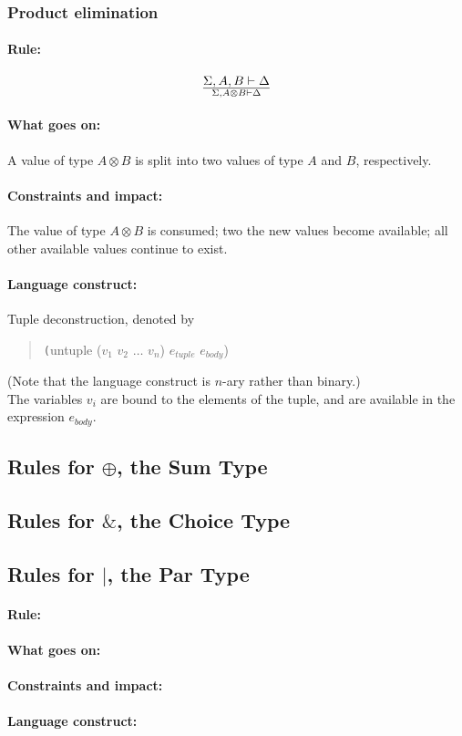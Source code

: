 \documentclass[a4paper]{article}
\begin{document}
\subsubsection{Product elimination}
\paragraph{Rule:}
$$
{
  \Sigma, A, B \vdash \Delta
}\over{
  \Sigma, A\otimes B \vdash \Delta
}
$$

\paragraph{What goes on:} A value of type $A \otimes B$ is split into two values of type $A$ and $B$, respectively.
\paragraph{Constraints and impact:} The value of type $A \otimes B$ is consumed; two the new values become available; all other available values continue to exist.
\paragraph{Language construct:} Tuple deconstruction, denoted by
\begin{quote}\texttt
  (untuple ($v_1$ $v_2$ $\ldots$ $v_n$) $e_{tuple}$ $e_{body}$)
\end{quote}
(Note that the language construct is $n$-ary rather than binary.)\\
The variables $v_i$ are bound to the elements of the tuple, and are available in the expression $e_{body}$.


\subsection{Rules for $\oplus$, the Sum Type}
\subsection{Rules for $\&$, the Choice Type}
\subsection{Rules for $|$, the Par Type}

\paragraph{Rule:}
\paragraph{What goes on:}
\paragraph{Constraints and impact:}
\paragraph{Language construct:}



\end{document}
